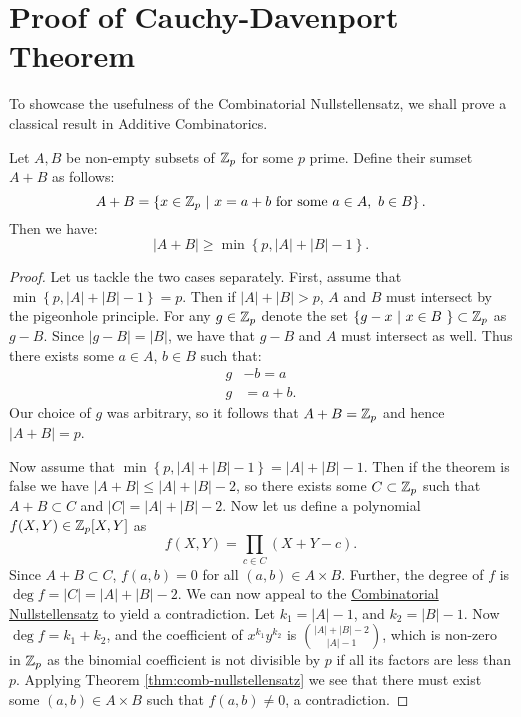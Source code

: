 \section{Proof of Cauchy-Davenport Theorem}
To showcase the usefulness of the Combinatorial Nullstellensatz, we shall prove a classical result in Additive Combinatorics. 
\begin{theorem}  \label{thm:C-D}
    Let $A,B$ be non-empty subsets of $\mathbb Z_p$ for some $p$ prime. Define their sumset $A+B$ as follows:
    \[
    A + B = 
    \left\{ x \in \mathbb Z_p\ | \ x = a+b \text{  for some } a\in A, \ b \in B \right\}.
    \]
    Then we have:
    \[
    |A+B| \geq  \min \left\{p, |A| + |B| -1 \right\}.
    \]
\end{theorem}

\begin{proof}
    Let us tackle the two cases separately. First, assume that $\min \left\{p, |A| + |B| -1 \right\} = p$.
    Then if $|A| + |B| > p$, $A$ and $B$ must intersect by the pigeonhole principle.
    For any $g \in \mathbb Z_p$ denote the set  $\left\{ g - x  \ | \ x \in B \  \right\} \subset \mathbb Z_p$ as $g-B$. Since $|g-B| = |B|$, we have that 
    $g-B$ and $A$ must intersect as well. Thus there exists some $a \in A$, $b \in B$ such that: 
    \begin{align*}
        g& -b = a \\
        g& = a+b.
    \end{align*}
    Our choice of $g$ was arbitrary, so it follows that $A+B = \mathbb Z_p$ and hence $|A+B| = p$.

    Now assume that $\min \left\{p, |A| + |B| -1 \right\} = |A| + |B| -1$. Then if the theorem is false we have $|A+B| \leq |A| + |B| -2$, so there exists some $C \subset \mathbb Z_p$ such that 
    $A+B \subset C$ and $|C| =  |A| + |B| -2$. Now let us define a polynomial $f(X,Y) \in \mathbb Z_p [X,Y]$ as
    \[
        f(X,Y) = \prod_{c \in C} (X+Y -c).
    \]
    Since $A+B \subset C$, $f(a,b) =0$ for all $(a,b) \in A\times B$. Further, the degree of $f$ is $\deg f = |C| = |A| + |B| -2$. 
    We can now appeal to the \hyperref[thm:comb-nullstellensatz]{Combinatorial Nullstellensatz} to yield a contradiction. Let $k_1 = |A| -1$, and $k_2 = |B|-1$. 
    Now $\deg f = k_1 + k_2$, and the coefficient of $x^{k_1}y^{k_2}$ is
    ${|A|+|B| - 2} \choose {|A|- 1}$, which is non-zero in $\mathbb Z_p$ as the binomial coefficient is not divisible by $p$ if all its factors are less than $p$. Applying Theorem \ref{thm:comb-nullstellensatz} we see that there 
    must exist some $(a,b) \in A \times B$ such that $f(a,b) \neq 0$, a contradiction.
\end{proof}

